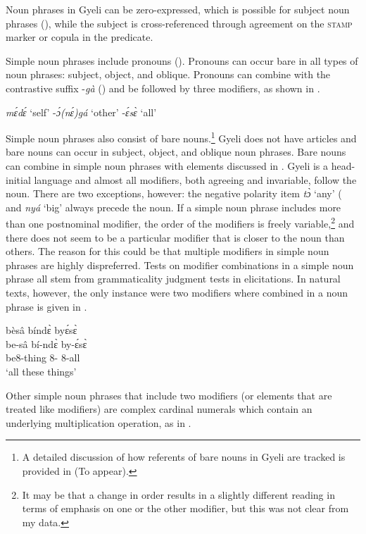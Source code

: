 Noun phrases in Gyeli can be zero-expressed, which is possible for subject noun phrases (), while the subject is cross-referenced through agreement on the \textsc{stamp} marker or copula in the predicate.

Simple noun phrases include pronouns (). Pronouns can occur bare in all types of noun phrases: subject, object, and oblique. Pronouns can combine with the contrastive suffix -{\itshape gà} () and be followed by three modifiers, as shown in .

\ea\label{protemp1}
\ea {\PRO} {\itshape mɛ́dɛ́} `self'
\ex {\PRO} -{\itshape ɔ́(nɛ́)gá} `other'
\ex {\PRO} -{\itshape ɛ́sɛ̀} `all'
\z
\z

Simple noun phrases also consist of bare nouns.\footnote{A detailed discussion of how referents of bare nouns in Gyeli are tracked is provided in \citeauthor{grimmforthb} (To appear).} Gyeli does not have articles and bare nouns can occur in subject, object, and oblique noun phrases. Bare nouns can combine in simple noun phrases with elements discussed in . Gyeli is a head-initial language and almost all modifiers, both agreeing and invariable, follow the noun. There are two exceptions, however: the negative polarity item {\itshape tɔ̀} `any'  ( and {\itshape nyá} `big' always precede the noun. If a simple noun phrase includes more than one postnominal modifier, the order of the modifiers is freely variable,\footnote{It may be that a change in order results in a slightly different reading in terms of emphasis on one or the other modifier, but this was not clear from my data.} and there does not seem to be a particular modifier that is closer to the noun than others. The reason for this could be that multiple modifiers in simple noun phrases are highly dispreferred. Tests on modifier combinations in a simple noun phrase all stem from grammaticality judgment tests in elicitations. In natural texts, however, the only instance were two modifiers where combined in a noun phrase is given in .

\ea\label{protemp2}
 \glll  bèsâ bíndɛ̀ byɛ́sɛ̀ \\
be-sâ bí-ndɛ̀ by-ɛ́sɛ̀ \\
be8-thing 8-{\ANA} 8-all \\
 \trans `all these things'
\z

Other simple noun phrases that include two modifiers (or elements that are treated like modifiers) are complex cardinal numerals which contain an underlying multiplication operation, as in .

